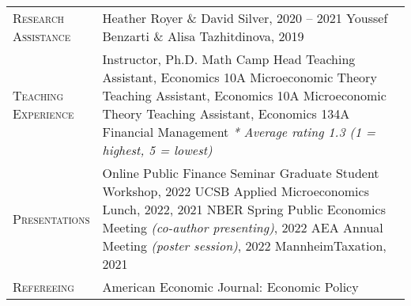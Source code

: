 \documentclass[11pt]{article}
\begin{document}
\begin{tabularx}{\textwidth}{@{}Y Z@{}}
	\textsc{Research \newline Assistance} \vspace{20pt} & 
	Heather Royer \& David Silver, 2020 -- 2021 
	\vspace{3pt} \newline 
	Youssef Benzarti \& Alisa Tazhitdinova, 2019
	\\[20pt]
	
	\textsc{Teaching \newline Experience} \vspace{20pt} & 
	Instructor, Ph.D. Math Camp
	\vspace{3pt} \newline
	Head Teaching Assistant, Economics 10A Microeconomic Theory
	\vspace{3pt} \newline
	Teaching Assistant, Economics 10A Microeconomic Theory
	\vspace{3pt} \newline
	Teaching Assistant, Economics 134A Financial Management
	\vspace{3pt} \newline
	\textit{* Average rating 1.3 (1 = highest, 5 = lowest)}
	\\[20pt]
	
	\textsc{Presentations} \vspace{20pt} & 
	Online Public Finance Seminar Graduate Student Workshop, 2022  
	\vspace{3pt} \newline
	UCSB Applied Microeconomics Lunch, 2022, 2021
	\vspace{3pt} \newline
	NBER Spring Public Economics Meeting \textit{(co-author presenting)}, 2022  
	\vspace{3pt} \newline
	AEA Annual Meeting \textit{(poster session)}, 2022 
	\vspace{3pt} \newline
	MannheimTaxation, 2021 
	\\[20pt]
	
	\textsc{Refereeing} \vspace{20pt} & 
	American Economic Journal: Economic Policy
	\\[20pt]
	

\end{tabularx}
\end{document}
